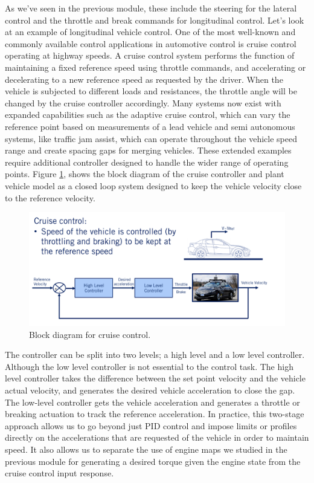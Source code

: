 As we've seen in the previous module, these include the steering for the lateral control and the throttle and break commands for longitudinal control. 
Let's look at an example of longitudinal vehicle control. 
One of the most well-known and commonly available control applications in automotive control is cruise control operating at highway speeds. 
A cruise control system performs the function of maintaining a fixed reference speed using throttle commands, and accelerating or decelerating to a new reference speed as requested by the driver. 
When the vehicle is subjected to different loads and resistances, the throttle angle will be changed by the cruise controller accordingly. 
Many systems now exist with expanded capabilities such as the adaptive cruise control, which can vary the reference point based on measurements of a 
lead vehicle and semi autonomous systems, like traffic jam assist, which can operate throughout the vehicle 
speed range and create spacing gaps for merging vehicles. 
These extended examples require additional controller designed to handle the wider range of operating points. 
Figure \ref{cruise_control}, shows the block diagram of the cruise controller and plant vehicle model as a closed loop system 
designed to keep the vehicle velocity close to the reference velocity. 


\begin{figure}[!htb]
\begin{center}
\includegraphics[scale=0.380]{img/longitudinal_control/cruise_control.jpeg}
\end{center}
\caption{Block diagram for cruise control.}
\label{cruise_control}
\end{figure}

The controller can be split into two levels; a high level and a low level controller. 
Although the low level controller is not essential to the control task. 
The high level controller takes the difference between the set point velocity and the vehicle actual velocity, 
and generates the desired vehicle acceleration to close the gap. 
The low-level controller gets the vehicle acceleration and generates a throttle or breaking actuation to track the reference acceleration. 
In practice, this two-stage approach allows us to go beyond just PID control and impose limits or profiles directly on the accelerations that are requested of the vehicle in order to maintain speed. 
It also allows us to separate the use of engine maps we studied in the previous module for generating a desired torque given the engine state from the cruise control input response. 

